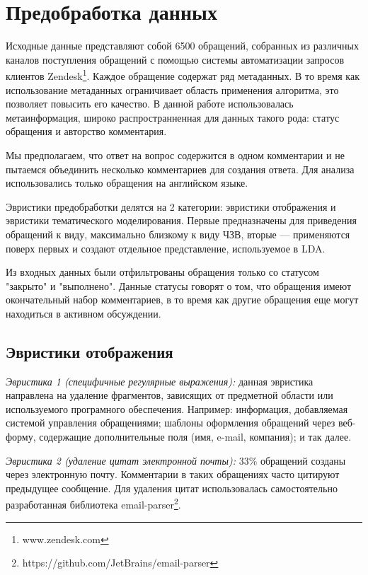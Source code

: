 \section{Предобработка данных}
\label{sec:dev}

Исходные данные представляют собой 6500 обращений, собранных из различных каналов поступления обращений с помощью системы автоматизации запросов клиентов Zendesk\footnote{www.zendesk.com}. Каждое обращение содержат ряд метаданных. В то время как использование метаданных ограничивает область применения алгоритма, это позволяет повысить его качество. В данной работе использовалась метаинформация, широко распространненная для данных такого рода: статус обращения и авторство комментария.

Мы предполагаем, что ответ на вопрос содержится в одном комментарии и не пытаемся объединить несколько комментариев для создания ответа. Для анализа использовались только обращения на английском языке.

Эвристики предобработки делятся на 2 категории: эвристики отображения и эвристики тематического моделирования. Первые предназначены для приведения обращений к виду, максимально близкому к виду ЧЗВ, вторые --- применяются поверх первых и создают отдельное представление, используемое в LDA.

Из входных данных были отфильтрованы обращения только со статусом "закрыто" и "выполнено". Данные статусы говорят о том, что обращения  имеют окончательный набор комментариев, в то время как другие обращения еще могут находиться в активном обсуждении.

\subsection{Эвристики отображения}
\label{subsec:lnfheur}

\textit{Эвристика 1 (специфичные регулярные выражения): }  данная эвристика направлена на удаление фрагментов, зависящих от предметной области или используемого програмного обеспечения. Например: информация, добавляемая системой управления обращениями; шаблоны оформления обращений через веб-форму, содержащие дополнительные поля (имя, e-mail, компания); и так далее.

\textit{Эвристика 2 (удаление цитат электронной почты):} 33\% обращений созданы через электронную почту. Комментарии в таких обращениях часто цитируют предыдущее сообщение. Для удаления цитат использовалась самостоятельно разработанная библиотека email-parser\footnote{https://github.com/JetBrains/email-parser}.

